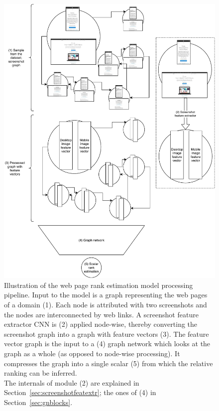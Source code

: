 \begin{figure}
    \centering

    \includegraphics[scale=0.55]{resources/model-architecture}
    \caption[Illustration of the model processing pipeline]{Illustration of the web page rank estimation model processing pipeline. Input to the model is a graph representing the web pages of a domain (1). Each node is attributed with two screenshots and the nodes are interconnected by web links. A screenshot feature extractor CNN is (2) applied node-wise, thereby converting the screenshot graph into a graph with feature vectors (3). The feature vector graph is the input to a (4) graph network which looks at the graph as a whole (as opposed to node-wise processing). It compresses the graph into a single scalar (5) from which the relative ranking can be inferred.\\
    The internals of module (2) are explained in Section~\ref{sec:screenshotfeatextr}; the ones of (4) in Section~\ref{sec:gnblocks}.}
    \label{fig:methodcomponents}
\end{figure}

